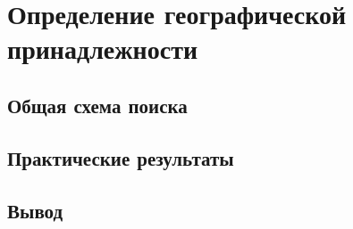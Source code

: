 \chapter{Определение географической принадлежности}
\section{Общая схема поиска}
\section{Практические результаты}
\section{Вывод}
